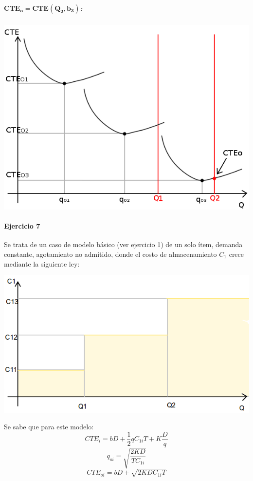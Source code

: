\documentclass{article}
\begin{document}
	\subparagraph{$\mathbf{CTE_o = CTE(Q_2, b_3)}$:}
	\begin{center}
	\includegraphics[scale=0.4,keepaspectratio=true]{img/6/6_CTE1_vs_Q2.png} 
	\end{center}

\pagebreak

\paragraph{Ejercicio 7}
Se trata de un caso de modelo básico (ver ejercicio 1) de un solo ítem, demanda constante, agotamiento no admitido, donde el costo de almacenamiento $C_{1}$ crece mediante la siguiente ley:
\begin{center}
  \includegraphics[scale=0.4,keepaspectratio=true]{img/7/7_QvsC1.png} 
\end{center}
Se sabe que para este modelo:
  \begin{equation}\label{7_CTE}CTE_i = bD + \frac{1}{2}qC_{1i}T + K\frac{D}{q} \end{equation}
  $$ q_{oi} = \sqrt{ \frac{2KD}{TC_{1i}}} $$
  $$ CTE_{oi} = bD + \sqrt{ 2KDC_{1i}T }$$
\end{document}
